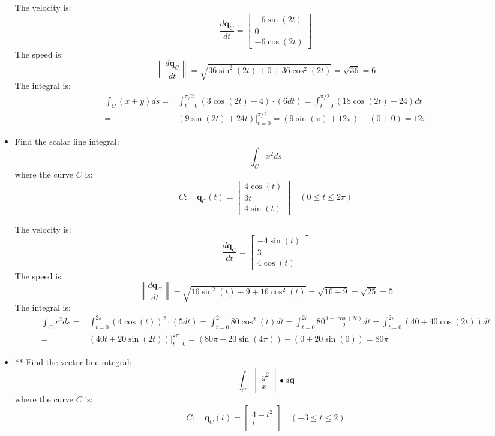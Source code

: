 \documentclass{article}
\begin{document}
\begin{itemize}
The velocity is:
\[\frac{d\mathbf{q}_C}{dt} = \begin{bmatrix} -6\sin(2t) \\ 0 \\ -6\cos(2t) \end{bmatrix}\]
The speed is:
\[\left\|\frac{d\mathbf{q}_C}{dt}\right\| 
= \sqrt{36\sin^2(2t) + 0 + 36\cos^2(2t)} 
= \sqrt{36} = 6\] 
The integral is:
\begin{align*}
\int_C (x + y) ds = & \int_{t = 0}^{\pi/2} (3\cos(2t) + 4) \cdot (6dt) 
= \int_{t = 0}^{\pi/2} (18\cos(2t) + 24) dt \\  
= & (9\sin(2t) + 24t)\bigg|_{t = 0}^{\pi/2} 
= (9\sin(\pi) + 12\pi) - (0 + 0) 
= 12\pi
\end{align*}

\item
Find the scalar line integral: 
\[\int_C x^2 ds\]
where the curve \(C\) is:
\[C : \quad 
\mathbf{q}_C(t) = \begin{bmatrix} 
4\cos(t) \\ 3t \\ 4\sin(t)
\end{bmatrix} \quad 
(0 \leq t \leq 2\pi)\]

The velocity is:
\[\frac{d\mathbf{q}_C}{dt} = \begin{bmatrix} -4\sin(t) \\ 3 \\ 4\cos(t) \end{bmatrix}\]
The speed is:
\[\left\|\frac{d\mathbf{q}_C}{dt}\right\| 
= \sqrt{16\sin^2(t) + 9 + 16\cos^2(t)}
= \sqrt{16 + 9} = \sqrt{25} = 5\]
The integral is:
\begin{align*}
\int_C x^2 ds = & \int_{t = 0}^{2\pi} (4\cos(t))^2 \cdot (5dt) 
= \int_{t = 0}^{2\pi} 80\cos^2(t) dt 
= \int_{t = 0}^{2\pi} 80\frac{1 + \cos(2t)}{2} dt   
= \int_{t = 0}^{2\pi} (40 + 40\cos(2t))dt \\ 
= & (40t + 20\sin(2t))\Big|_{t=0}^{2\pi} 
= (80\pi + 20\sin(4\pi)) - (0 + 20\sin(0)) 
= 80\pi
\end{align*}

\item**
Find the vector line integral: 
\[\int_C \begin{bmatrix} y^2 \\ x \end{bmatrix} \bullet d\mathbf{q}\]
where the curve \(C\) is:
\[C : \quad 
\mathbf{q}_C(t) = \begin{bmatrix} 
4 - t^2 \\ t 
\end{bmatrix} \quad 
(-3 \leq t \leq 2)\]


\end{itemize}
\end{document}
